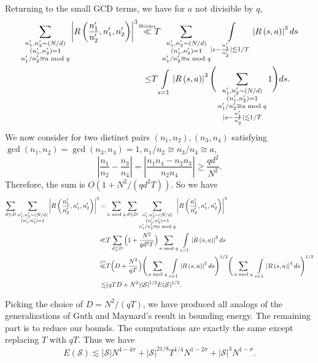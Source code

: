 Returning to the small GCD terms, we have for $a$ not divisible by $q$,
\begin{align*}
    \sum_{\substack{n_1',n_2'\sim (N/d)\\(n_1',n_2')=1\\n_1'/n_2'\cong a \mod q}}  \left|R\left(\frac{n_1'}{n_2'} ,n_1',n_2'\right) \right|^3
   \  \stackon{H\"older}{\ll}& \  T \sum_{\substack{n_1',n_2'\sim (N/d)\\(n_1',n_2')=1\\n_1'/n_2'\cong a \mod q}}\int\displaylimits_{|s-\frac{n_1'}{n_2'}|\lesssim 1/T}\left|R\left(s,a\right) \right|^3 ds\\
    \leq& T \int\displaylimits_{s\asymp 1} \left|R\left(s,a\right) \right|^3 \Bigg(\sum_{\substack{n_1',n_2'\sim (N/d)\\(n_1',n_2')=1\\n_1'/n_2'\cong a \mod q\\|s-\frac{n_1'}{n_2'}|\lesssim 1/T}} 1\Bigg)ds .
\end{align*}
We now consider for two distinct pairs $(n_1,n_2), (n_3,n_4)$ satisfying $\gcd(n_1,n_2)=\gcd(n_3,n_4)=1, n_1/n_2\cong n_3/n_4\cong a$, \[
\left|\frac{n_1}{n_2}-\frac{n_3}{n_4}\right|=\left|\frac{n_1n_4-n_2n_3}{n_2n_4}\right|\geq \frac{qd^2}{N^2}.
\]
Therefore, the sum is $O(1+{N^2}/({qd^2T}))$. So we have \begin{align*}
    \sum_{d\leq D}\sum_{\substack{n_1',n_2'\sim (N/d)\\(n_1',n_2')=1}}  \left|R\left(\frac{n_1'}{n_2'} ,n_1',n_2'\right) \right|^3 = &
   \sum_{a \mod q} \sum_{d\leq D}\sum_{\substack{n_1',n_2'\sim (N/d)\\(n_1',n_2')=1\\n_1'/n_2'\cong a \mod q}}  \left|R\left(\frac{n_1'}{n_2'} ,n_1',n_2'\right) \right|^3\\
   \ll& T \sum_{d\leq D}\Big(1+\frac{N^2}{qd^2T}\Big) \sum_{a \mod q}\ \int\displaylimits_{s\asymp 1} \left|R\left(s,a\right) \right|^3 ds\\
   \stackon{CS}{\ll}&T \Big(D+\frac{N^2}{qT}\Big)\Bigg(\sum_{a \mod q}\ \int\displaylimits_{s\asymp 1} \left|R\left(s,a\right) \right|^2 ds\Bigg)^{1/2}\Bigg(\sum_{a \mod q}\ \int\displaylimits_{s\asymp 1} \left|R\left(s,a\right) \right|^4 ds\Bigg)^{1/2}\\
   \lesssim& (qTD+N^2)|\mathcal{S}|^{1/2}E(\mathcal{S})^{1/2}.
\end{align*}

Picking the choice of $D=N^2/(qT)$, we have produced all analogs of the generalizations of Guth and Maynard's result in bounding energy. The remaining part is to reduce our bounds. The computations are exactly the same except replacing $T$ with $qT$. Thus we have \[
E(\mathcal{S})\lesssim |\mathcal{S}|N^{4-4\sigma}+|\mathcal{S}|^{21/8}T^{1/4}N^{1-2\sigma}+|\mathcal{S}|^3N^{1-\sigma}.
\]
